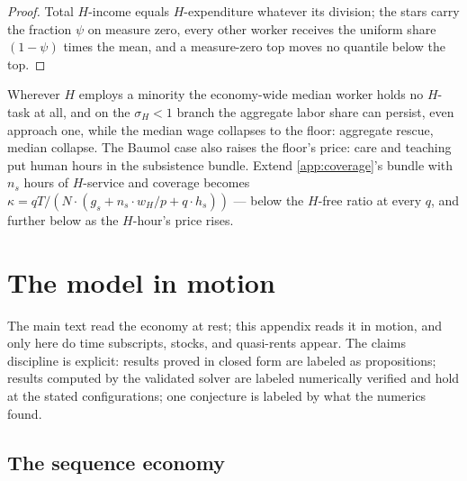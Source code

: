 \documentclass[12pt]{article}
\theoremstyle{plain}
\begin{document}
\begin{proof}
Total $H$-income equals $H$-expenditure whatever its division; the stars carry the fraction $\psi$ on measure zero, every other worker receives the uniform share $(1-\psi )$ times the mean, and a measure-zero top moves no quantile below the top.
\end{proof}

Wherever $H$ employs a minority the economy-wide median worker holds no $H$-task at all, and on the $\sigma _H < 1$ branch the aggregate labor share can persist, even approach one, while the median wage collapses to the floor: aggregate rescue, median collapse. The Baumol case also raises the floor's price: care and teaching put human hours in the subsistence bundle. Extend \ref{app:coverage}'s bundle with $n_s$ hours of $H$-service and coverage becomes $\kappa = qT/(N\cdot (g_s + n_s\cdot w_H/p + q\cdot h_s))$ --- below the $H$-free ratio at every $q$, and further below as the $H$-hour's price rises.

\section{The model in motion}\label{app:motion}

The main text read the economy at rest; this appendix reads it in motion, and only here do time subscripts, stocks, and quasi-rents appear. The claims discipline is explicit: results proved in closed form are labeled as propositions; results computed by the validated solver are labeled numerically verified and hold at the stated configurations; one conjecture is labeled by what the numerics found.

\subsection{The sequence economy}\label{app:sequence-economy}
\end{document}
